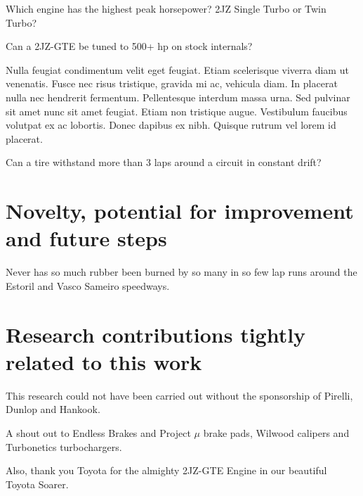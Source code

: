\setcounter{researchquestion}{0}
\begin{researchquestion}
Which engine has the highest peak horsepower? 2JZ Single Turbo or Twin Turbo?
\label{rq_1_can_collaborative_rdm_environment_engage_researchers_conclusions}
\end{researchquestion}

\setcounter{researchquestion}{2}
\begin{researchquestion}
Can a 2JZ-GTE be tuned to 500+ hp on stock internals?
\label{rq_3_can_researchers_produce_good_metadata_records_when_supported_conclusions}
\end{researchquestion}

Nulla feugiat condimentum velit eget feugiat. Etiam scelerisque viverra diam ut venenatis. Fusce nec risus tristique, gravida mi ac, vehicula diam. In placerat nulla nec hendrerit fermentum. Pellentesque interdum massa urna. Sed pulvinar sit amet nunc sit amet feugiat. Etiam non tristique augue. Vestibulum faucibus volutpat ex ac lobortis. Donec dapibus ex nibh. Quisque rutrum vel lorem id placerat.


\setcounter{researchquestion}{1}
\begin{researchquestion}
Can a tire withstand more than 3 laps around a circuit in constant drift?
\label{rq_2_can_usage_information_be_used_to_provide_adequate_recommendations_conclusions}
\end{researchquestion}


\section{Novelty, potential for improvement and future steps} %
\label{sub:novelty_potential_for_improvement_and_future_steps}

Never has so much rubber been burned by so many in so few lap runs around the Estoril and Vasco Sameiro speedways.


\section{Research contributions tightly related to this work} %
\label{sec:research_contributions_tightly_related_to_this_work}

This research could not have been carried out without the sponsorship of Pirelli, Dunlop and Hankook.

A shout out to Endless Brakes and Project $\mu$ brake pads, Wilwood calipers and Turbonetics turbochargers.

Also, thank you Toyota for the almighty 2JZ-GTE Engine in our beautiful Toyota Soarer.


